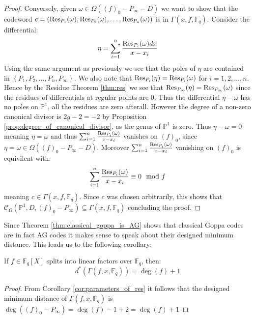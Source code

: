 \begin{proof}
  Conversely, given $\omega \in \Omega((f)_0 - P_{\infty} - D)$ we want to show that the codeword $c = (\textnormal{Res}_{P_{1}}(\omega), \textnormal{Res}_{P_{2}}(\omega), \ldots, \textnormal{Res}_{P_{n}}(\omega))$ is in $\Gamma(x, f, \mathbb{F}_q)$. Consider the differential:
  \begin{equation*}
    \eta = \sum_{i = 1}^n \frac{\textnormal{Res}_{P_{i}}(\omega)dx}{x - x_{i}}
  \end{equation*}
  Using the same argument as previously we see that the poles of $\eta$ are contained in $\left\{P_1, P_2, \ldots, P_{n}, P_{\infty}\right\}$. We also note that $\textnormal{Res}_{P_i}(\eta) = \textnormal{Res}_{P_i}(\omega)$ for $i = 1, 2, \ldots, n$. Hence by the Residue Theorem \ref{thm:res} we see that $\textnormal{Res}_{P_{\infty}}(\eta) = \textnormal{Res}_{P_\infty}(\omega)$ since the residues of differentials at regular points are $0$. Thus the differential $\eta - \omega$ has no poles on $\mathbb{P}^{1}$, all the residues are zero afterall. However the degree of a non-zero canonical divisor is $2g - 2 = - 2$ by Proposition \ref{prop:degree_of_canonical_divisor}, as the genus of $\mathbb{P}^1$ is zero. Thus $\eta - \omega = 0$ meaning $\eta = \omega$ and thus $\sum_{i = 1}^n \frac{\textnormal{Res}_{P_{i}}(\omega)}{x - x_{i}}$ vanishes on $(f)_0$, since $\eta = \omega \in \Omega((f)_0 - P_{\infty} - D)$. Moreover $\sum_{i = 1}^n \frac{\textnormal{Res}_{P_{i}}(\omega)}{x - x_{i}}$ vanishing on $(f)_0$ is equivilent with:
  \begin{equation*}
    \sum_{i = 1}^n \frac{\textnormal{Res}_{P_{i}}(\omega)}{x - x_{i}} \equiv 0 \mod f
  \end{equation*}
  meaning $c \in \Gamma(x, f, \mathbb{F}_q)$. Since $c$ was chosen arbitrarily, this shows that $\mathcal{C}_{\Omega}(\mathbb{P}^1, D, (f)_0 - P_{\infty}) \subseteq \Gamma(x, f, \mathbb{F}_q)$ concluding the proof.
\end{proof}
Since Theorem \ref{thm:classical_goppa_is_AG} shows that classical Goppa codes are in fact AG codes it makes sense to speak about their designed minimum distance. This leads us to the following corollary:
\begin{corollary}\label{cor:f_splitting_yields_design_distance}
  If $f \in \mathbb{F}_q[X]$ splits into linear factors over $\mathbb{F}_q$, then:
\begin{equation*}
  d^{*}\left(\Gamma(f, x, \mathbb{F}_q)\right) = \deg(f) + 1
\end{equation*}
\end{corollary}
\begin{proof}
  From Corollary \ref{cor:parameters_of_res} it follows that the designed minimum distance of $\Gamma(f, x, \mathbb{F}_q)$ is $\deg((f)_0 - P_{\infty}) = \deg(f) - 1 + 2 = \deg(f) + 1$
\end{proof}


